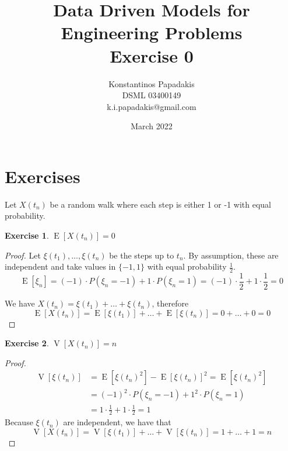 \documentclass{article}
\title{Data Driven Models for Engineering Problems\\Exercise 0}
\author{Konstantinos Papadakis\\DSML 03400149\\k.i.papadakis@gmail.com}
\date{March 2022}
\DeclareMathOperator{\E}{\mathrm{E}}
\DeclareMathOperator{\V}{\mathrm{V}}
\newtheorem{exercise}{Exercise}[section]
\begin{document}
\maketitle


\section{Exercises}

Let \(X(t_n)\) be a random walk where each step is either 1 or -1 with equal probability.

\begin{exercise}
    \( \E[X(t_n)] = 0 \)
\end{exercise}
\begin{proof}
    Let \( \xi(t_1), \dots , \xi(t_n) \) be the steps up to \(t_n\).
    By assumption, these are independent and take values
    in \(\{-1, 1\}\) with equal probability \(\frac{1}{2}\).
    \begin{equation*}
        \E[\xi_n] = (-1) \cdot P(\xi_n = -1) + 1 \cdot P(\xi_n = 1) = (-1) \cdot \frac{1}{2} + 1 \cdot \frac{1}{2} = 0
    \end{equation*}

    We have \(X(t_n) = \xi(t_1) + \dots + \xi(t_n) \), therefore
    \begin{equation*}
        \E[X(t_n)] = \E[\xi(t_1)] + \dots + \E[\xi(t_n)] = 0 + \dots + 0 = 0
    \end{equation*}
\end{proof}


\begin{exercise}
    \( \V[X(t_n)] = n \)
\end{exercise}
\begin{proof}
    \begin{equation*}
        \begin{split}
            \V[\xi(t_n)] &= \E[\xi(t_n)^2] - \E[\xi(t_n)]^2 = \E[\xi(t_n)^2]\\
            &= (-1)^2 \cdot P(\xi_n = -1) + 1^2 \cdot P(\xi_n = 1)\\
            &= 1 \cdot \frac{1}{2} + 1 \cdot \frac{1}{2} = 1
        \end{split}
    \end{equation*}
    Because \(\xi(t_n)\) are independent, we have that
    \begin{equation*}
        \V[X(t_n)] = \V[\xi(t_1)] + \dots + \V[\xi(t_n)] = 1 + \dots + 1 = n
    \end{equation*}
\end{proof}
\end{document}

